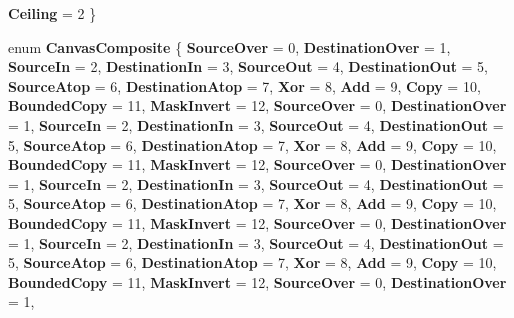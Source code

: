 \begin{DoxyCompactItemize}
{\bfseries Ceiling} = 2
 \}
\item 
\mbox{\label{namespace_microsoft_1_1_graphics_1_1_canvas_ad4d6dae38d1a118a5742bdb597529f1e}} 
enum {\bfseries Canvas\+Composite} \{ \newline
{\bfseries Source\+Over} = 0, 
{\bfseries Destination\+Over} = 1, 
{\bfseries Source\+In} = 2, 
{\bfseries Destination\+In} = 3, 
\newline
{\bfseries Source\+Out} = 4, 
{\bfseries Destination\+Out} = 5, 
{\bfseries Source\+Atop} = 6, 
{\bfseries Destination\+Atop} = 7, 
\newline
{\bfseries Xor} = 8, 
{\bfseries Add} = 9, 
{\bfseries Copy} = 10, 
{\bfseries Bounded\+Copy} = 11, 
\newline
{\bfseries Mask\+Invert} = 12, 
{\bfseries Source\+Over} = 0, 
{\bfseries Destination\+Over} = 1, 
{\bfseries Source\+In} = 2, 
\newline
{\bfseries Destination\+In} = 3, 
{\bfseries Source\+Out} = 4, 
{\bfseries Destination\+Out} = 5, 
{\bfseries Source\+Atop} = 6, 
\newline
{\bfseries Destination\+Atop} = 7, 
{\bfseries Xor} = 8, 
{\bfseries Add} = 9, 
{\bfseries Copy} = 10, 
\newline
{\bfseries Bounded\+Copy} = 11, 
{\bfseries Mask\+Invert} = 12, 
{\bfseries Source\+Over} = 0, 
{\bfseries Destination\+Over} = 1, 
\newline
{\bfseries Source\+In} = 2, 
{\bfseries Destination\+In} = 3, 
{\bfseries Source\+Out} = 4, 
{\bfseries Destination\+Out} = 5, 
\newline
{\bfseries Source\+Atop} = 6, 
{\bfseries Destination\+Atop} = 7, 
{\bfseries Xor} = 8, 
{\bfseries Add} = 9, 
\newline
{\bfseries Copy} = 10, 
{\bfseries Bounded\+Copy} = 11, 
{\bfseries Mask\+Invert} = 12, 
{\bfseries Source\+Over} = 0, 
\newline
{\bfseries Destination\+Over} = 1, 
{\bfseries Source\+In} = 2, 
{\bfseries Destination\+In} = 3, 
{\bfseries Source\+Out} = 4, 
\newline
{\bfseries Destination\+Out} = 5, 
{\bfseries Source\+Atop} = 6, 
{\bfseries Destination\+Atop} = 7, 
{\bfseries Xor} = 8, 
\newline
{\bfseries Add} = 9, 
{\bfseries Copy} = 10, 
{\bfseries Bounded\+Copy} = 11, 
{\bfseries Mask\+Invert} = 12, 
\newline
{\bfseries Source\+Over} = 0, 
{\bfseries Destination\+Over} = 1, 

\end{DoxyCompactItemize}
